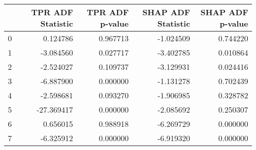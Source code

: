 \begin{tabular}{lrrrr}
\toprule
 & TPR ADF Statistic & TPR ADF p-value & SHAP ADF Statistic & SHAP ADF p-value \\
\midrule
0 & 0.124786 & 0.967713 & -1.024509 & 0.744220 \\
1 & -3.084560 & 0.027717 & -3.402785 & 0.010864 \\
2 & -2.524027 & 0.109737 & -3.129931 & 0.024416 \\
3 & -6.887900 & 0.000000 & -1.131278 & 0.702439 \\
4 & -2.598681 & 0.093270 & -1.906985 & 0.328782 \\
5 & -27.369417 & 0.000000 & -2.085692 & 0.250307 \\
6 & 0.656015 & 0.988918 & -6.269729 & 0.000000 \\
7 & -6.325912 & 0.000000 & -6.919320 & 0.000000 \\
\bottomrule
\end{tabular}
